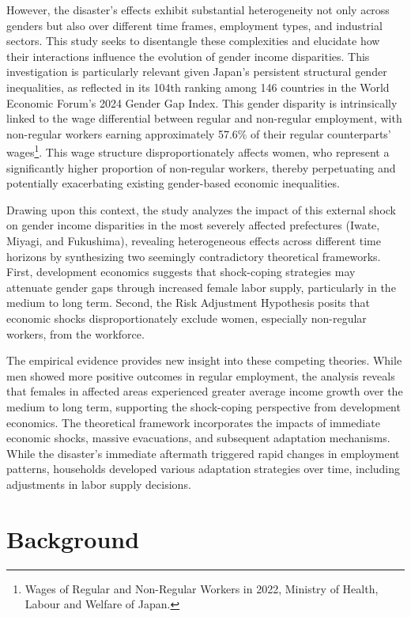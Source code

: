 \documentclass[a4paper,12pt]{article}
\begin{document}
However, the disaster's effects exhibit substantial heterogeneity not only across genders but also over different time frames, employment types, and industrial sectors. This study seeks to disentangle these complexities and elucidate how their interactions influence the evolution of gender income disparities. This investigation is particularly relevant given Japan's persistent structural gender inequalities, as reflected in its 104th ranking among 146 countries in the World Economic Forum's 2024 Gender Gap Index. This gender disparity is intrinsically linked to the wage differential between regular and non-regular employment, with non-regular workers earning approximately 57.6\% of their regular counterparts' wages\footnote{Wages of Regular and Non-Regular Workers in 2022, Ministry of Health, Labour and Welfare of Japan.}. This wage structure disproportionately affects women, who represent a significantly higher proportion of non-regular workers, thereby perpetuating and potentially exacerbating existing gender-based economic inequalities.


Drawing upon this context, the study analyzes the impact of this external shock on gender income disparities in the most severely affected prefectures (Iwate, Miyagi, and Fukushima), revealing heterogeneous effects across different time horizons by synthesizing two seemingly contradictory theoretical frameworks. First, development economics suggests that shock-coping strategies may attenuate gender gaps through increased female labor supply, particularly in the medium to long term. Second, the Risk Adjustment Hypothesis posits that economic shocks disproportionately exclude women, especially non-regular workers, from the workforce. 

The empirical evidence provides new insight into these competing theories. While men showed more positive outcomes in regular employment, the analysis reveals that females in affected areas experienced greater average income growth over the medium to long term, supporting the shock-coping perspective from development economics. The theoretical framework incorporates the impacts of immediate economic shocks, massive evacuations, and subsequent adaptation mechanisms. While the disaster's immediate aftermath triggered rapid changes in employment patterns, households developed various adaptation strategies over time, including adjustments in labor supply decisions.

\section{Background}
\end{document}
